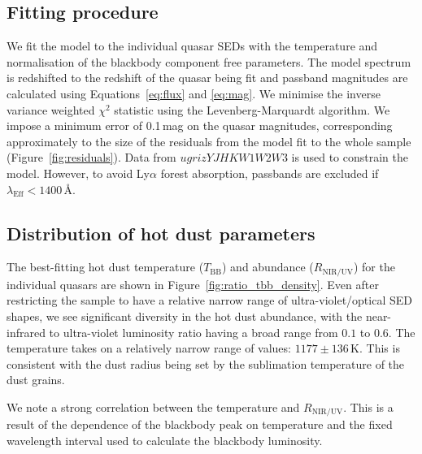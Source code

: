 \subsection{Fitting procedure}

We fit the model to the individual quasar SEDs with the temperature and normalisation of the blackbody component free parameters. 
The model spectrum is redshifted to the redshift of the quasar being fit and passband magnitudes are calculated using Equations~\ref{eq:flux} and \ref{eq:mag}.   
We minimise the inverse variance weighted $\chi^2$ statistic using the Levenberg-Marquardt algorithm. 
We impose a minimum error of 0.1\,mag on the quasar magnitudes, corresponding approximately to the size of the residuals from the model fit to the whole sample (Figure~\ref{fig:residuals}). 
Data from $ugrizYJHKW1W2W3$ is used to constrain the model. 
However, to avoid Ly$\alpha$ forest absorption, passbands are excluded if $\lambda_{\text{Eff}} < 1400$\,\AA.   

\subsection{Distribution of hot dust parameters}

The best-fitting hot dust temperature ($T_{\text{BB}}$) and abundance ($R_{\text{NIR/UV}}$) for the individual quasars are shown in Figure~\ref{fig:ratio_tbb_density}.
Even after restricting the sample to have a relative narrow range of ultra-violet/optical SED shapes, we see significant diversity in the hot dust abundance, with the near-infrared to ultra-violet luminosity ratio having a broad range from $0.1$ to $0.6$.
The temperature takes on a relatively narrow range of values: $1177\pm136$\,K. 
This is consistent with the dust radius being set by the sublimation temperature of the dust grains. 

We note a strong correlation between the temperature and $R_{\text{NIR/UV}}$. 
This is a result of the dependence of the blackbody peak on temperature and the fixed wavelength interval used to calculate the blackbody luminosity. 

